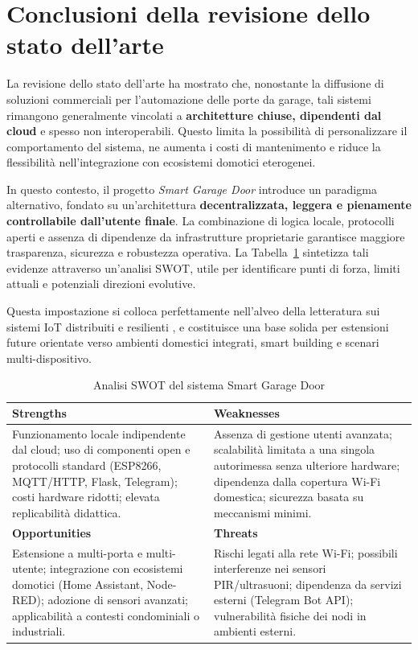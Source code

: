 \vspace{8mm}

\section{Conclusioni della revisione dello stato dell’arte}

La revisione dello stato dell’arte ha mostrato che, nonostante la diffusione di soluzioni commerciali per l’automazione delle porte da garage, tali sistemi rimangono generalmente vincolati a \textbf{architetture chiuse, dipendenti dal cloud} e spesso non interoperabili. Questo limita la possibilità di personalizzare il comportamento del sistema, ne aumenta i costi di mantenimento e riduce la flessibilità nell’integrazione con ecosistemi domotici eterogenei.

In questo contesto, il progetto \textit{Smart Garage Door} introduce un paradigma alternativo, fondato su un'architettura \textbf{decentralizzata, leggera e pienamente controllabile dall’utente finale}. La combinazione di logica locale, protocolli aperti e assenza di dipendenze da infrastrutture proprietarie garantisce maggiore trasparenza, sicurezza e robustezza operativa. La Tabella~\ref{tab:swot} sintetizza tali evidenze attraverso un’analisi SWOT, utile per identificare punti di forza, limiti attuali e potenziali direzioni evolutive.

Questa impostazione si colloca perfettamente nell’alveo della letteratura sui sistemi IoT distribuiti e resilienti \cite{Palattella2016, Piyare2013, Holler2014}, e costituisce una base solida per estensioni future orientate verso ambienti domestici integrati, smart building e scenari multi-dispositivo.

\begin{table}[H]
\centering
\caption{Analisi SWOT del sistema Smart Garage Door}
\label{tab:swot}
\renewcommand{\arraystretch}{1.4}
\begin{tabularx}{\textwidth}{|X|X|}
\hline
\textbf{Strengths} & \textbf{Weaknesses} \\ \hline
Funzionamento locale indipendente dal cloud; uso di componenti open e protocolli standard (ESP8266, MQTT/HTTP, Flask, Telegram); costi hardware ridotti; elevata replicabilità didattica. &
Assenza di gestione utenti avanzata; scalabilità limitata a una singola autorimessa senza ulteriore hardware; dipendenza dalla copertura Wi-Fi domestica; sicurezza basata su meccanismi minimi. \\ \hline
\textbf{Opportunities} & \textbf{Threats} \\ \hline
Estensione a multi-porta e multi-utente; integrazione con ecosistemi domotici (Home Assistant, Node-RED); adozione di sensori avanzati; applicabilità a contesti condominiali o industriali. &
Rischi legati alla rete Wi-Fi; possibili interferenze nei sensori PIR/ultrasuoni; dipendenza da servizi esterni (Telegram Bot API); vulnerabilità fisiche dei nodi in ambienti esterni. \\ \hline
\end{tabularx}
\end{table}
